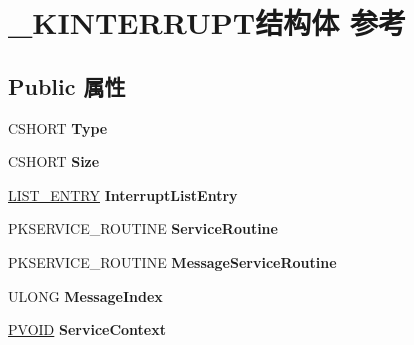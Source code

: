 \hypertarget{struct___k_i_n_t_e_r_r_u_p_t}{}\section{\+\_\+\+K\+I\+N\+T\+E\+R\+R\+U\+P\+T结构体 参考}
\label{struct___k_i_n_t_e_r_r_u_p_t}
\subsection*{Public 属性}
\begin{DoxyCompactItemize}
\item 
\mbox{\label{struct___k_i_n_t_e_r_r_u_p_t_aafb678a879e62c60fd894da9d5beed1c}} 
C\+S\+H\+O\+RT {\bfseries Type}
\item 
\mbox{\label{struct___k_i_n_t_e_r_r_u_p_t_a4621ae7a0cbfdc807d2491fdff90d3fb}} 
C\+S\+H\+O\+RT {\bfseries Size}
\item 
\mbox{\label{struct___k_i_n_t_e_r_r_u_p_t_a9d34fa24626d0934a338673668b00ed3}} 
\hyperlink{struct___l_i_s_t___e_n_t_r_y}{L\+I\+S\+T\+\_\+\+E\+N\+T\+RY} {\bfseries Interrupt\+List\+Entry}
\item 
\mbox{\label{struct___k_i_n_t_e_r_r_u_p_t_ab7f8011f2f227eb842867c82177e3bf4}} 
P\+K\+S\+E\+R\+V\+I\+C\+E\+\_\+\+R\+O\+U\+T\+I\+NE {\bfseries Service\+Routine}
\item 
\mbox{\label{struct___k_i_n_t_e_r_r_u_p_t_a7a75e932055d1e4bc2f91dafbda8d3f0}} 
P\+K\+S\+E\+R\+V\+I\+C\+E\+\_\+\+R\+O\+U\+T\+I\+NE {\bfseries Message\+Service\+Routine}
\item 
\mbox{\label{struct___k_i_n_t_e_r_r_u_p_t_aa2d7e592b3f9cc78e12f5942a99b5435}} 
U\+L\+O\+NG {\bfseries Message\+Index}
\item 
\mbox{\label{struct___k_i_n_t_e_r_r_u_p_t_ac411718002288948963d88cdb4da9fb6}} 
\hyperlink{interfacevoid}{P\+V\+O\+ID} {\bfseries Service\+Context}
\item 
\mbox{\label{struct___k_i_n_t_e_r_r_u_p_t_a8457b51c1a7a46a5f6ae044f8a77fbe1}} 

\end{DoxyCompactItemize}
